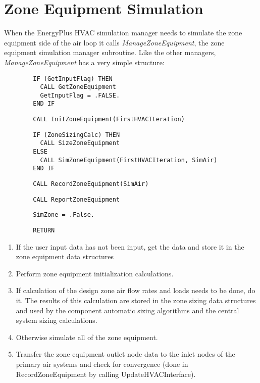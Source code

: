 \section{Zone Equipment Simulation}\label{zone-equipment-simulation}

When the EnergyPlus HVAC simulation manager needs to simulate the zone equipment side of the air loop it calls \emph{ManageZoneEquipment}, the zone equipment simulation manager subroutine. Like the other managers, \emph{ManageZoneEquipment} has a very simple structure:

\begin{lstlisting}
        IF (GetInputFlag) THEN
          CALL GetZoneEquipment
          GetInputFlag = .FALSE.
        END IF
\end{lstlisting}

\begin{lstlisting}
        CALL InitZoneEquipment(FirstHVACIteration)
\end{lstlisting}

\begin{lstlisting}
        IF (ZoneSizingCalc) THEN
          CALL SizeZoneEquipment
        ELSE
          CALL SimZoneEquipment(FirstHVACIteration, SimAir)
        END IF
\end{lstlisting}

\begin{lstlisting}
        CALL RecordZoneEquipment(SimAir)
\end{lstlisting}

\begin{lstlisting}
        CALL ReportZoneEquipment
\end{lstlisting}

\begin{lstlisting}
        SimZone = .False.
\end{lstlisting}

\begin{lstlisting}
        RETURN
\end{lstlisting}

\begin{enumerate}
\def\labelenumi{\arabic{enumi}.}
\item
  If the user input data has not been input, get the data and store it in the zone equipment data structures
\item
  Perform zone equipment initialization calculations.
\item
  If calculation of the design zone air flow rates and loads needs to be done, do it. The results of this calculation are stored in the zone sizing data structures and used by the component automatic sizing algorithms and the central system sizing calculations.
\item
  Otherwise simulate all of the zone equipment.
\item
  Transfer the zone equipment outlet node data to the inlet nodes of the primary air systems and check for convergence (done in RecordZoneEquipment by calling UpdateHVACInterface).
\end{enumerate}

